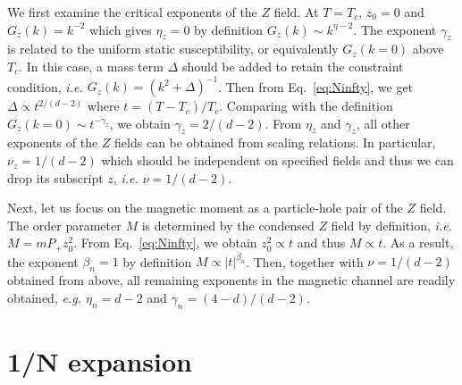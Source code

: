 \documentclass[aps,twocolumn,superscriptaddress]{revtex4-1}
\newcommand{\ie}{\textit{i.e.{ }}}
\newcommand{\eg}{\textit{e.g.{ }}}
\begin{document}
We first examine the critical exponents of the $Z$ field. At $T=T_c$, $z_0=0$ and $G_z(k)=k^{-2}$ which gives $\eta_z=0$
by definition $G_z(k)\sim k^{\eta-2}$. The exponent $\gamma_z$ is related to the uniform static susceptibility, or
equivalently $G_z(k=0)$ above $T_c$. In this case, a mass term $\Delta$ should be added to retain the constraint
condition, \ie $G_z(k)=(k^2+\Delta)^{-1}$. \cite{ma1973} Then from Eq.~\ref{eq:Ninfty}, we get $\Delta\propto t^{2/(d-2)}$ where
$t=(T-T_c)/T_c$. Comparing with the definition $G_z(k=0)\sim t^{-\gamma_z}$, we obtain $\gamma_z=2/(d-2)$. From $\eta_z$
and $\gamma_z$, all other exponents of the $Z$ fields can be obtained from scaling relations. In particular,
$\nu_z=1/(d-2)$ which should be independent on specified fields and thus we can drop its subscript $z$, \ie
$\nu=1/(d-2)$. 

Next, let us focus on the magnetic moment as a particle-hole pair of the $Z$ field. The order parameter $M$ is
determined by the condensed $Z$ field by definition, \ie $M=mP_+z_0^2$. From Eq.~\ref{eq:Ninfty}, we obtain
$z_0^2\propto t$ and thus $M\propto t$. As a result, the exponent $\beta_n=1$ by definition $M\propto |t|^{\beta_n}$.
Then, together with $\nu=1/(d-2)$ obtained from above, all remaining exponents in the magnetic channel are readily obtained, 
\eg $\eta_n=d-2$ and $\gamma_n=(4-d)/(d-2)$. 


\section{1/N expansion}
\end{document}
